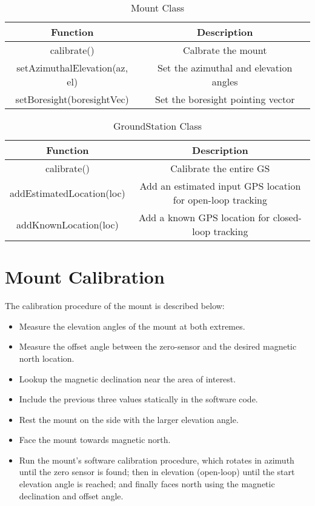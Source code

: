 \begin{table}[!htb]
  \centering
  \caption{Mount Class}
  \renewcommand{\arraystretch}{1.2}
  \begin{tabular}{ |c|c| }
  \hline
  \textbf{Function}        & \textbf{Description}    \\
  \hline
    calibrate()                         & Calbrate the mount \\
    setAzimuthalElevation(az, el)       & Set the azimuthal and elevation angles \\
    setBoresight(boresightVec)          & Set the boresight pointing vector \\
  \hline
  \end{tabular}
  \label{tab:mountUML}
\end{table}

\begin{table}[!htb]
  \centering
  \caption{GroundStation Class}
  \renewcommand{\arraystretch}{1.2}
  \begin{tabular}{ |c|c| }
  \hline
  \textbf{Function}             & \textbf{Description}    \\
  \hline
    calibrate()                 & Calibrate the entire GS \\
    addEstimatedLocation(loc)      & Add an estimated input GPS location for open-loop tracking \\
    addKnownLocation(loc)          & Add a known GPS location for closed-loop tracking \\
  \hline
  \end{tabular}
  \label{tab:groundStationUML}
\end{table}

\section{Mount Calibration}\label{sec:appendix_mount_calibration}

The calibration procedure of the mount is described below:
\begin{itemize}
  \item Measure the elevation angles of the mount at both extremes.
  \item Measure the offset angle between the zero-sensor and the desired magnetic north location.
  \item Lookup the magnetic declination near the area of interest.
  \item Include the previous three values statically in the software code.
  \item Rest the mount on the side with the larger elevation angle.
  \item Face the mount towards magnetic north.
  \item Run the mount's software calibration procedure, which rotates in azimuth until the zero sensor is found; then in elevation (open-loop) until the start elevation angle is reached; and finally faces north using the magnetic declination and offset angle.
\end{itemize}